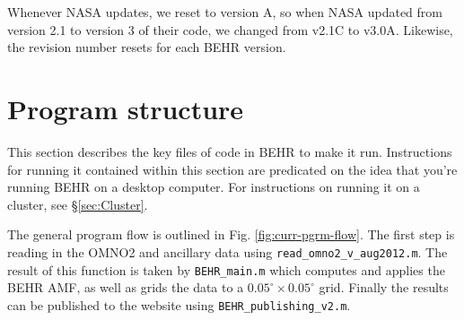 \documentclass[12pt]{article}
\begin{document}
	Whenever NASA updates, we reset to version A, so when NASA updated from version 2.1 to version 3 of their code, we changed from v2.1C to v3.0A.  Likewise, the revision number resets for each BEHR version.

\section{Program structure}
	This section describes the key files of code in BEHR to make it run.  Instructions for running it contained within this section are predicated on the idea that you're running BEHR on a desktop computer.  For instructions on running it on a cluster, see \S\ref{sec:Cluster}.
	
	The general program flow is outlined in Fig. \ref{fig:curr-pgrm-flow}. The first step is reading in the OMNO2 and ancillary data using \lstinline$read_omno2_v_aug2012.m$. The result of this function is taken by \lstinline$BEHR_main.m$ which computes and applies the BEHR AMF, as well as grids the data to a $0.05^\circ \times 0.05^\circ$ grid. Finally the results can be published to the website using \lstinline$BEHR_publishing_v2.m$.
\end{document}

